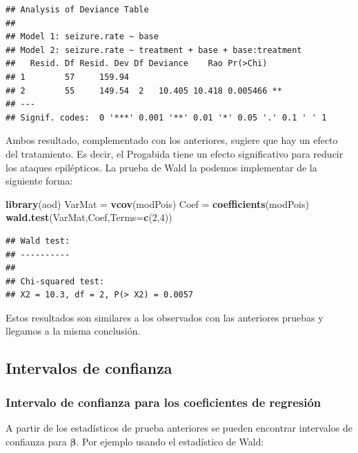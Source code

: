 \documentclass[
]{article}
\newenvironment{Shaded}{\begin{snugshade}}{\end{snugshade}}
\newcommand{\AttributeTok}[1]{\textcolor[rgb]{0.13,0.29,0.53}{#1}}
\newcommand{\DecValTok}[1]{\textcolor[rgb]{0.00,0.00,0.81}{#1}}
\newcommand{\FunctionTok}[1]{\textcolor[rgb]{0.13,0.29,0.53}{\textbf{#1}}}
\newcommand{\NormalTok}[1]{#1}
\newcommand{\OtherTok}[1]{\textcolor[rgb]{0.56,0.35,0.01}{#1}}
\begin{document}
\begin{verbatim}
## Analysis of Deviance Table
## 
## Model 1: seizure.rate ~ base
## Model 2: seizure.rate ~ treatment + base + base:treatment
##   Resid. Df Resid. Dev Df Deviance    Rao Pr(>Chi)   
## 1        57     159.94                               
## 2        55     149.54  2   10.405 10.418 0.005466 **
## ---
## Signif. codes:  0 '***' 0.001 '**' 0.01 '*' 0.05 '.' 0.1 ' ' 1
\end{verbatim}

Ambos resultado, complementado con los anteriores, sugiere que hay un efecto del tratamiento. Es decir, el Progabida tiene un efecto significativo para reducir los ataques epilépticos. La prueba de Wald la podemos implementar de la siguiente forma:

\begin{Shaded}
\begin{Highlighting}[]
\FunctionTok{library}\NormalTok{(aod)}
\NormalTok{VarMat }\OtherTok{=} \FunctionTok{vcov}\NormalTok{(modPois)}
\NormalTok{Coef }\OtherTok{=} \FunctionTok{coefficients}\NormalTok{(modPois)}
\FunctionTok{wald.test}\NormalTok{(VarMat,Coef,}\AttributeTok{Terms=}\FunctionTok{c}\NormalTok{(}\DecValTok{2}\NormalTok{,}\DecValTok{4}\NormalTok{))}
\end{Highlighting}
\end{Shaded}

\begin{verbatim}
## Wald test:
## ----------
## 
## Chi-squared test:
## X2 = 10.3, df = 2, P(> X2) = 0.0057
\end{verbatim}

Estos resultados son similares a los observados con las anteriores pruebas y llegamos a la misma conclusión.

\subsection{Intervalos de confianza}\label{intervalos-de-confianza-1}

\subsubsection{Intervalo de confianza para los coeficientes de regresión}\label{intervalo-de-confianza-para-los-coeficientes-de-regresiuxf3n}

A partir de los estadísticos de prueba anteriores se pueden encontrar intervalos de confianza para \(\boldsymbol \beta\). Por ejemplo usando el estadístico de Wald:
\end{document}
